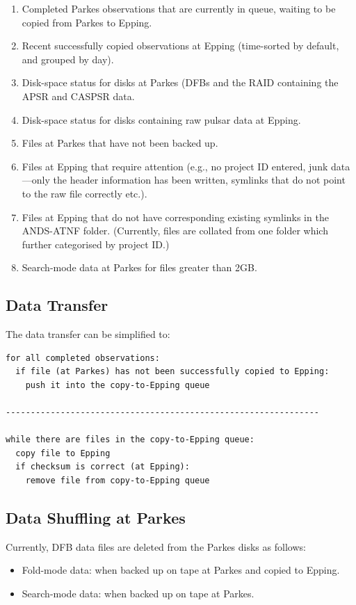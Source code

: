 \documentclass[a4paper,11pt]{article}
\begin{document}
\begin{enumerate}
\item Completed Parkes observations that are currently in queue, waiting to be copied from Parkes to Epping.
\item Recent successfully copied observations at Epping (time-sorted by default, and grouped by day).
\item Disk-space status for disks at Parkes (DFBs and the RAID containing the APSR and CASPSR data.
\item Disk-space status for disks containing raw pulsar data at Epping.
\item Files at Parkes that have not been backed up.
\item Files at Epping that require attention (e.g., no project ID entered, junk data---only the header information has been written, symlinks that do not point to the raw file correctly etc.).
\item Files at Epping that do not have corresponding existing symlinks in the ANDS-ATNF folder. (Currently, files are collated from one folder which further categorised by project ID.)
\item Search-mode data at Parkes for files greater than 2GB.
\end{enumerate}

\subsection{Data Transfer}

The data transfer can be simplified to:
\begin{verbatim}
for all completed observations: 
  if file (at Parkes) has not been successfully copied to Epping:
    push it into the copy-to-Epping queue

---------------------------------------------------------------

while there are files in the copy-to-Epping queue:
  copy file to Epping
  if checksum is correct (at Epping):
    remove file from copy-to-Epping queue
\end{verbatim}

\subsection{Data Shuffling at Parkes}
Currently, DFB data files are deleted from the Parkes disks as follows:
\begin{itemize}
\item Fold-mode data: when backed up on tape at Parkes and copied to Epping.
\item Search-mode data: when backed up on tape at Parkes.
\end{itemize}
\end{document}
